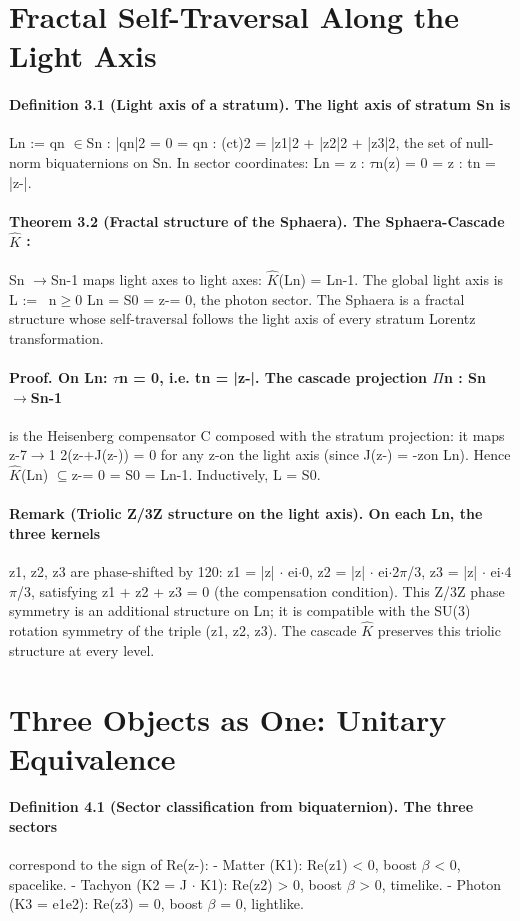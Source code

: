 \documentclass[12pt,a4paper]{article}
\begin{document}
\section{Fractal Self-Traversal Along the Light Axis}
\paragraph*{Definition 3.1 (Light axis of a stratum). The light axis of stratum Sn is}
Ln := {qn $\in$Sn : |qn|2 = 0} = {qn : (ct)2 = |z1|2 + |z2|2 + |z3|2}, the set of null-norm biquaternions on Sn. In sector coordinates: Ln = {z : $\tau$n(z) = 0} = {z : tn = |z-|}.
\paragraph*{Theorem 3.2 (Fractal structure of the Sphaera). The Sphaera-Cascade $\hat K$ :}
Sn $\to$Sn-1 maps light axes to light axes: $\hat K$(Ln) = Ln-1. The global light axis is L := \ n$\geq$0 Ln = S0 = {z-= 0}, the photon sector. The Sphaera is a fractal structure whose self-traversal follows the light axis of every stratum Lorentz transformation.
\paragraph*{Proof. On Ln: $\tau$n = 0, i.e. tn = |z-|. The cascade projection $\Pi$n : Sn $\to$Sn-1}
is the Heisenberg compensator C composed with the stratum projection: it maps z-7$\to$1 2(z-+J(z-)) = 0 for any z-on the light axis (since J(z-) = -zon Ln). Hence $\hat K$(Ln) $\subseteq${z-= 0} = S0 = Ln-1. Inductively, L = S0.
\paragraph*{Remark (Triolic Z/3Z structure on the light axis). On each Ln, the three kernels}
z1, z2, z3 are phase-shifted by 120: z1 = |z| $\cdot$ ei$\cdot$0, z2 = |z| $\cdot$ ei$\cdot$2$\pi$/3, z3 = |z| $\cdot$ ei$\cdot$4$\pi$/3, satisfying z1 + z2 + z3 = 0 (the compensation condition). This Z/3Z phase symmetry is an additional structure on Ln; it is compatible with the SU(3) rotation symmetry of the triple (z1, z2, z3). The cascade $\hat K$ preserves this triolic structure at every level.

\section{Three Objects as One: Unitary Equivalence}
\paragraph*{Definition 4.1 (Sector classification from biquaternion). The three sectors}
correspond to the sign of Re(z-):
- Matter (K1): Re(z1) < 0, boost $\beta$ < 0, spacelike.
- Tachyon (K2 = J $\cdot$ K1): Re(z2) > 0, boost $\beta$ > 0, timelike.
- Photon (K3 = e1e2): Re(z3) = 0, boost $\beta$ = 0, lightlike.
\end{document}
